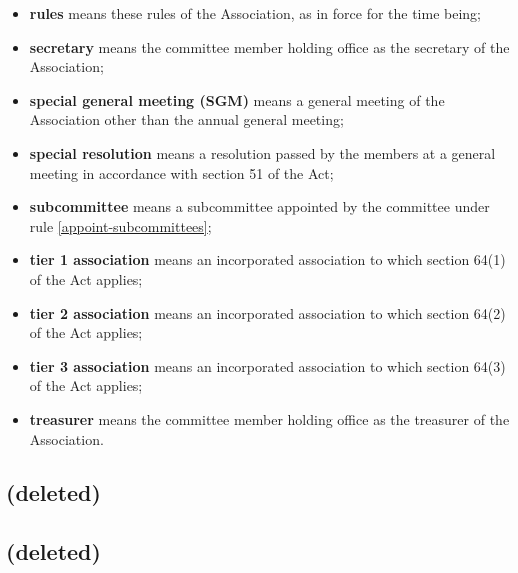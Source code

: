 \documentclass[../constitution.tex]{subfiles}
\begin{document}
\begin{itemize}[label={-}]
  \item \textbf{rules} means these rules of the Association, as in force for the time being;
  \item \textbf{secretary} means the committee member holding office as the secretary of the Association;
  \item \textbf{special general meeting (SGM)} means a general meeting of the Association other than the annual general meeting;
  \item \textbf{special resolution} means a resolution passed by the members at a general meeting in accordance with section 51 of the Act;
  \item \textbf{subcommittee} means a subcommittee appointed by the committee under rule \ref{appoint-subcommittees};
  \item \textbf{tier 1 association} means an incorporated association to which section 64(1) of the Act applies;
  \item \textbf{tier 2 association} means an incorporated association to which section 64(2) of the Act applies;
  \item \textbf{tier 3 association} means an incorporated association to which section 64(3) of the Act applies;
  \item \textbf{treasurer} means the committee member holding office as the treasurer of the Association.
\end{itemize}


\subsection{(deleted)}


\subsection{(deleted)}
\end{document}

